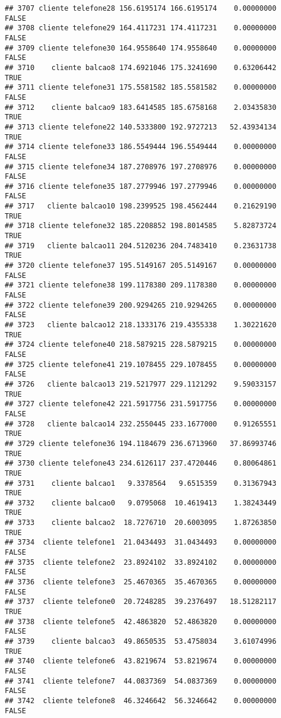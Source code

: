 \documentclass[
]{article}
\begin{document}
\begin{verbatim}
## 3707 cliente telefone28 156.6195174 166.6195174    0.00000000    FALSE
## 3708 cliente telefone29 164.4117231 174.4117231    0.00000000    FALSE
## 3709 cliente telefone30 164.9558640 174.9558640    0.00000000    FALSE
## 3710    cliente balcao8 174.6921046 175.3241690    0.63206442     TRUE
## 3711 cliente telefone31 175.5581582 185.5581582    0.00000000    FALSE
## 3712    cliente balcao9 183.6414585 185.6758168    2.03435830     TRUE
## 3713 cliente telefone22 140.5333800 192.9727213   52.43934134     TRUE
## 3714 cliente telefone33 186.5549444 196.5549444    0.00000000    FALSE
## 3715 cliente telefone34 187.2708976 197.2708976    0.00000000    FALSE
## 3716 cliente telefone35 187.2779946 197.2779946    0.00000000    FALSE
## 3717   cliente balcao10 198.2399525 198.4562444    0.21629190     TRUE
## 3718 cliente telefone32 185.2208852 198.8014585    5.82873724     TRUE
## 3719   cliente balcao11 204.5120236 204.7483410    0.23631738     TRUE
## 3720 cliente telefone37 195.5149167 205.5149167    0.00000000    FALSE
## 3721 cliente telefone38 199.1178380 209.1178380    0.00000000    FALSE
## 3722 cliente telefone39 200.9294265 210.9294265    0.00000000    FALSE
## 3723   cliente balcao12 218.1333176 219.4355338    1.30221620     TRUE
## 3724 cliente telefone40 218.5879215 228.5879215    0.00000000    FALSE
## 3725 cliente telefone41 219.1078455 229.1078455    0.00000000    FALSE
## 3726   cliente balcao13 219.5217977 229.1121292    9.59033157     TRUE
## 3727 cliente telefone42 221.5917756 231.5917756    0.00000000    FALSE
## 3728   cliente balcao14 232.2550445 233.1677000    0.91265551     TRUE
## 3729 cliente telefone36 194.1184679 236.6713960   37.86993746     TRUE
## 3730 cliente telefone43 234.6126117 237.4720446    0.80064861     TRUE
## 3731    cliente balcao1   9.3378564   9.6515359    0.31367943     TRUE
## 3732    cliente balcao0   9.0795068  10.4619413    1.38243449     TRUE
## 3733    cliente balcao2  18.7276710  20.6003095    1.87263850     TRUE
## 3734  cliente telefone1  21.0434493  31.0434493    0.00000000    FALSE
## 3735  cliente telefone2  23.8924102  33.8924102    0.00000000    FALSE
## 3736  cliente telefone3  25.4670365  35.4670365    0.00000000    FALSE
## 3737  cliente telefone0  20.7248285  39.2376497   18.51282117     TRUE
## 3738  cliente telefone5  42.4863820  52.4863820    0.00000000    FALSE
## 3739    cliente balcao3  49.8650535  53.4758034    3.61074996     TRUE
## 3740  cliente telefone6  43.8219674  53.8219674    0.00000000    FALSE
## 3741  cliente telefone7  44.0837369  54.0837369    0.00000000    FALSE
## 3742  cliente telefone8  46.3246642  56.3246642    0.00000000    FALSE

\end{verbatim}
\end{document}
